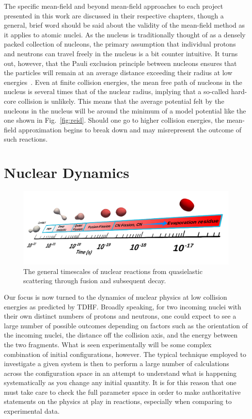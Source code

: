 The specific mean-field and beyond mean-field approaches to each project presented in this work are discussed in their respective chapters, though a general, brief word should be said about the validity of the mean-field method as it applies to atomic nuclei.
As the nucleus is traditionally thought of as a densely packed collection of nucleons, the primary assumption that individual protons and neutrons can travel freely in the nucleus is a bit counter intuitive.
It turns out, however, that the Pauli exclusion principle between nucleons ensures that the particles will remain at an average distance exceeding their radius at low energies~\citep{ring1980}.
Even at finite collision energies, the mean free path of nucleons in the nucleus is several times that of the nuclear radius, implying that a so-called hard-core collision is unlikely.
This means that the average potential felt by the nucleons in the nucleus will be around the minimum of a model potential like the one shown in Fig.~\ref{fig:reid}.
Should one go to higher collision energies, the mean-field approximation begins to break down and may misrepresent the outcome of such reactions.

\section*{Nuclear Dynamics}

\begin{figure}[t]
	\includegraphics[width=\textwidth]{../Figures/intro_figs/timescale.png}
	\caption{The general timescales of nuclear reactions from quasielastic scattering through fusion and subsequent decay.}
	\label{fig:timescale}
\end{figure}

Our focus is now turned to the dynamics of nuclear physics at low collision energies as predicted by TDHF.
Broadly speaking, for two incoming nuclei with their own distinct numbers of protons and neutrons, one could expect to see a large number of possible outcomes depending on factors such as the orientation of the incoming nuclei, the distance off the collision axis, and the energy between the two fragments.
What is seen experimentally will be some complex combination of initial configurations, however.
The typical technique employed to investigate a given system is then to perform a large number of calculations across the configuration space in an attempt to understand what is happening systematically as you change any initial quantity.
It is for this reason that one must take care to check the full parameter space in order to make authoritative statements on the physics at play in reactions, especially when comparing to experimental data.

